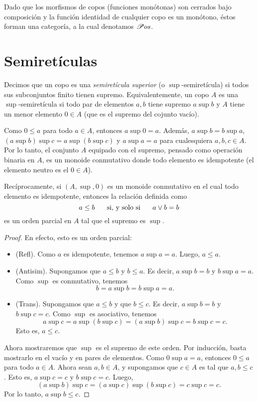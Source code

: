 Dado que los morfismos de copos (funciones monótonas)
son cerrados bajo composición y la función identidad
de cualquier copo es un monótono,
éstos forman una categoría, a la cual denotamos $\mathscr{P}os$.

\section{Semiretículas}
\label{ss:semireticulas}
Decimos que un copo es una \emph{ semiretícula superior }
(o $\sup$-semiretícula) si todos sus subconjuntos finito tienen
supremo.
Equivalentemente, un copo $A$ es una $\sup$-semiretícula si
todo par de elementos $a,b$ tiene supremo $a\sup b$
y $A$ tiene un menor elemento $0\in A$ (que es
el supremo del cojunto vacío).

Como $0\leq a$ para todo $a\in A$, entonces $a\sup 0=a$.
Además, $a\sup b=b\sup a$, $(a\sup b)\sup c=a\sup(b\sup c)$
y $a\sup a=a$ para cualesquiera $a,b,c\in A$.
Por lo tanto, el conjunto $A$ equipado con el supremo, pensado
como operación binaria en $A$, es un monoide
conmutativo donde todo elemento es idempotente
(el elemento neutro es el $0\in A$).

Recíprocamente, si $(A,\sup,0)$ es un monoide conmutativo
en el cual todo elemento es idempotente,
entonces la relación definida como
\[
  a\leq b \hspace{5mm}\text{ si, y solo si }\hspace{5mm} a\vee b=b
\]
es un orden parcial en $A$ tal que el supremo es $\sup$.
\begin{proof}
    En efecto, esto es un orden parcial:
    \begin{itemize}
        \item (Refl). Como $a$ es idempotente, tenemos $a\sup a=a$.
        Luego, $a\leq a$.
        \item (Antisim). Supongamos que $a\leq b$ y $b\leq a$.
        Es decir, $a\sup b=b$ y $b\sup a=a$.
        Como $\sup$ es conmutativo, tenemos
        \[
            b = a\sup b = b\sup a = a
        .\]
        \item (Trans). Supongamos que $a\leq b$ y que $b\leq c$.
        Es decir, $a\sup b = b$ y $b\sup c = c$.
        Como $\sup$ es asociativo, tenemos
        \[
            a\sup c = a\sup(b\sup c) = (a\sup b)\sup c = b\sup c = c
        .\]
        Esto es, $a\leq c$.
    \end{itemize}
    Ahora mostraremos que $\sup$ es el supremo de este orden.
    Por inducción, basta mostrarlo en el vacío y en
    pares de elementos.
    Como $0\sup a=a$, entonces $0\leq a$ para todo $a\in A$.
    Ahora sean $a,b\in A$, y supongamos que $c\in A$ es tal que
    $a,b\leq c$.
    Esto es, $a\sup c = c$ y $b\sup c = c$.
    Luego,
    \[
        (a\sup b)\sup c = (a\sup c)\sup(b\sup c) = c\sup c = c
    .\]
    Por lo tanto, $a\sup b\leq c$.
\end{proof}


